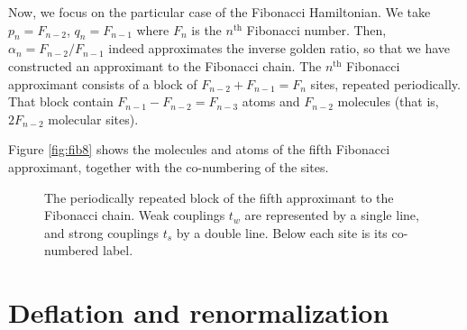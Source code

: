 \documentclass[11pt]{article}
\begin{document}
Now, we focus on the particular case of the Fibonacci Hamiltonian. 
We take $p_n = F_{n-2}$, $q_n = F_{n-1}$ where $F_n$ is the $n^\text{th}$ Fibonacci number. Then, $\alpha_n = F_{n-2}/F_{n-1}$ indeed approximates the inverse golden ratio, so that we have constructed an approximant to the Fibonacci chain.
The $n^\text{th}$ Fibonacci approximant consists of a block of $F_{n-2} + F_{n-1} = F_{n}$ sites, repeated periodically. That block contain $F_{n-1} - F_{n-2} = F_{n-3}$ atoms and $F_{n-2}$ molecules (that is, $2F_{n-2}$ molecular sites).

Figure \eqref{fig:fib8} shows the molecules and atoms of the fifth Fibonacci approximant, together with the co-numbering of the sites.

\begin{figure}[htp]
	\centering
	
	\caption{The periodically repeated block of the fifth approximant to the Fibonacci chain. Weak couplings $t_w$ are represented by a single line, and strong couplings $t_s$ by a double line. Below each site is its co-numbered label.}
\label{fig:fib8}
\end{figure}

\section{Deflation and renormalization}
\end{document}
